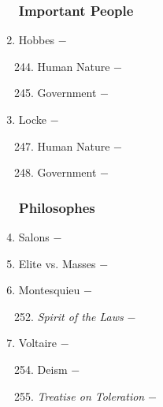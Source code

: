 \documentclass[12pt]{article}
\begin{document}
\begin{enumerate}
\subsubsection{Important People}

\item Hobbes $-$ 

\begin{enumerate}[label=\arabic{*}.]
\setcounter{enumii}{243}

\item Human Nature $-$ 

\item Government $-$

\end{enumerate}
\setcounter{enumi}{245}

\item Locke $-$ 

\begin{enumerate}[label=\arabic{*}.]
\setcounter{enumii}{246}

\item Human Nature $-$ 

\item Government $-$

\end{enumerate}
\setcounter{enumi}{248}
\subsubsection{Philosophes}

\item Salons $-$ 

\item Elite vs. Masses $-$

\item Montesquieu $-$ 

\begin{enumerate}[label=\arabic{*}.]
\setcounter{enumii}{251}

\item \textit{Spirit of the Laws} $-$

\end{enumerate}
\setcounter{enumi}{252}

\item Voltaire $-$ 

\begin{enumerate}[label=\arabic{*}.]
\setcounter{enumii}{253}

\item Deism $-$ 

\item \textit{Treatise on Toleration} $-$


\end{enumerate}
\end{enumerate}
\end{document}
